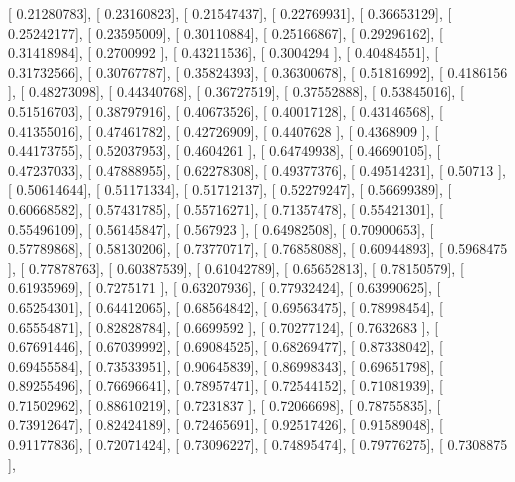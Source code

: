 \documentclass{article}
\begin{document}
       [ 0.21280783],
       [ 0.23160823],
       [ 0.21547437],
       [ 0.22769931],
       [ 0.36653129],
       [ 0.25242177],
       [ 0.23595009],
       [ 0.30110884],
       [ 0.25166867],
       [ 0.29296162],
       [ 0.31418984],
       [ 0.2700992 ],
       [ 0.43211536],
       [ 0.3004294 ],
       [ 0.40484551],
       [ 0.31732566],
       [ 0.30767787],
       [ 0.35824393],
       [ 0.36300678],
       [ 0.51816992],
       [ 0.4186156 ],
       [ 0.48273098],
       [ 0.44340768],
       [ 0.36727519],
       [ 0.37552888],
       [ 0.53845016],
       [ 0.51516703],
       [ 0.38797916],
       [ 0.40673526],
       [ 0.40017128],
       [ 0.43146568],
       [ 0.41355016],
       [ 0.47461782],
       [ 0.42726909],
       [ 0.4407628 ],
       [ 0.4368909 ],
       [ 0.44173755],
       [ 0.52037953],
       [ 0.4604261 ],
       [ 0.64749938],
       [ 0.46690105],
       [ 0.47237033],
       [ 0.47888955],
       [ 0.62278308],
       [ 0.49377376],
       [ 0.49514231],
       [ 0.50713   ],
       [ 0.50614644],
       [ 0.51171334],
       [ 0.51712137],
       [ 0.52279247],
       [ 0.56699389],
       [ 0.60668582],
       [ 0.57431785],
       [ 0.55716271],
       [ 0.71357478],
       [ 0.55421301],
       [ 0.55496109],
       [ 0.56145847],
       [ 0.567923  ],
       [ 0.64982508],
       [ 0.70900653],
       [ 0.57789868],
       [ 0.58130206],
       [ 0.73770717],
       [ 0.76858088],
       [ 0.60944893],
       [ 0.5968475 ],
       [ 0.77878763],
       [ 0.60387539],
       [ 0.61042789],
       [ 0.65652813],
       [ 0.78150579],
       [ 0.61935969],
       [ 0.7275171 ],
       [ 0.63207936],
       [ 0.77932424],
       [ 0.63990625],
       [ 0.65254301],
       [ 0.64412065],
       [ 0.68564842],
       [ 0.69563475],
       [ 0.78998454],
       [ 0.65554871],
       [ 0.82828784],
       [ 0.6699592 ],
       [ 0.70277124],
       [ 0.7632683 ],
       [ 0.67691446],
       [ 0.67039992],
       [ 0.69084525],
       [ 0.68269477],
       [ 0.87338042],
       [ 0.69455584],
       [ 0.73533951],
       [ 0.90645839],
       [ 0.86998343],
       [ 0.69651798],
       [ 0.89255496],
       [ 0.76696641],
       [ 0.78957471],
       [ 0.72544152],
       [ 0.71081939],
       [ 0.71502962],
       [ 0.88610219],
       [ 0.7231837 ],
       [ 0.72066698],
       [ 0.78755835],
       [ 0.73912647],
       [ 0.82424189],
       [ 0.72465691],
       [ 0.92517426],
       [ 0.91589048],
       [ 0.91177836],
       [ 0.72071424],
       [ 0.73096227],
       [ 0.74895474],
       [ 0.79776275],
       [ 0.7308875 ],
\end{document}
